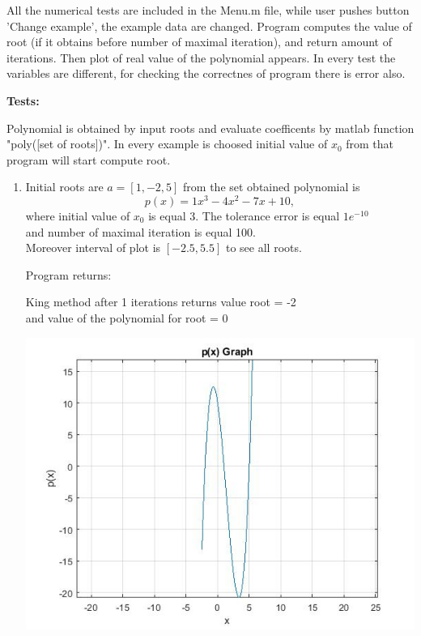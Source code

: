 \documentclass[12pt]{article}
\begin{document}
\vskip20pt

\noindent
All the numerical tests are included in the Menu.m file, while user pushes button 'Change example', the example data are changed. Program computes the value of root (if it obtains before number of maximal iteration), and return amount of iterations. Then plot of real value of the polynomial appears.
In every test the variables are different, for checking the correctnes of program there is error also.

\bigskip

\textbf{Tests:}

Polynomial is obtained by input roots and evaluate coefficents by matlab function "poly([set of roots])".
In every example is choosed initial value of $ x_{0}$ from that program will start compute root.

\begin{enumerate}

\vskip20pt

\item
Initial roots are $a=[1,-2,5]$ from the set obtained polynomial is\\
\begin{equation*}
p(x)=1x^3  -4x^2    -7x    +10,
\end{equation*}
where initial value of $x_{0}$ is equal 3.
The tolerance error is equal $1e^{-10}$ \\and number of maximal iteration is equal 100.
\\Moreover interval of plot is $[-2.5,5.5]$ to see all roots. 

\vskip20pt

Program returns:
\begin{center}
King method after 1 iterations returns value root = -2\\
and value of the polynomial for root = 0
\end{center}

\begin{center}
   \includegraphics[scale=0.6]{Example_1.jpg}
\end{center}


\end{enumerate}
\end{document}
